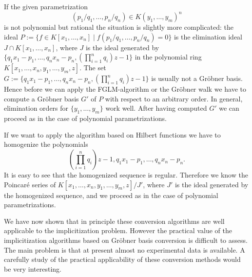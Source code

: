 \medskip
If the given parametrization 
\[ (p_1/q_1,\ldots,p_n/q_n)\in K(y_1,\ldots,y_m)^n \]
is not polynomial but rational 
the situation is slightly more complicated: the ideal 
$P:=\{f\in K[x_1,\ldots,x_n]\mid f(p_1/q_1,\ldots,p_n/q_n)=0\}$ 
is the elimination ideal $J\cap K[x_1,\ldots,x_n]$, where $J$ is the
ideal generated by $\{q_1x_1-p_1,\ldots,q_nx_n-p_n,(\prod_{i=1}^n q_i)z-1\}$ 
in the polynomial ring $K[x_1,\ldots,x_n,y_1,\ldots,y_m,z]$.
The set
$G:=\{q_1x_1-p_1,\ldots,q_nx_n-p_n,(\prod_{i=1}^n q_i)z-1\}$
is usually not a Gr\"obner basis. Hence before we can apply the FGLM-algorithm
or the Gr\"obner walk we have to compute a Gr\"obner basis $G'$ of $P$
with respect to an arbitrary order. In general, elimination orders for
$\{y_1,\ldots,y_m\}$ work well. After having computed $G'$ we
can proceed as in the case of polynomial parametrizations.

If we want to apply the algorithm based on Hilbert functions we have
to homogenize the polynomials 
\[ (\prod_{i=1}^n q_i)z-1,q_1x_1-p_1,\ldots,q_nx_n-p_n. \]
It is easy to see that the homogenized sequence 
is regular. Therefore we know the 
Poincar\'e series of $K[x_1,\ldots,x_n,y_1,\ldots,y_m,z]/J'$, where
$J'$ is the ideal generated by the homogenized sequence, and we proceed
as in the case of polynomial parametrizations.

\medskip
We have now shown that in principle these conversion algorithms are
well applicable to the implicitization problem.
However the practical value of the implicitization algorithms 
based on Gr\"obner basis
conversion is difficult to assess. The main problem is that at present
almost no experimental data is available.  
A carefully study of the practical applicability of these 
conversion methods would be very interesting.

